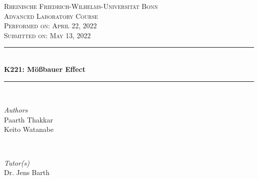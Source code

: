 \documentclass[a4paper]{report}
\numberwithin{equation}{section}
\begin{document}
\begin{titlepage} %
	\newcommand{\HRule}{\rule{\linewidth}{0.5mm}} %
	
	\center %
	
	\textsc{\LARGE Rheinische Friedrich-Wilhelms-Universit\"at Bonn }\\[4cm] %
	
	\textsc{\Large Advanced Laboratory Course}\\[0.5cm] %
	
	\textsc{\large Performed on: April 22, 2022}\\[0.5cm] %

	\textsc{\large Submitted on: May 13, 2022}\\[0.5cm] %
	
	
	\HRule\\[0.4cm]
	
	{\huge\bfseries K221: M{\"{o}}{\ss}bauer Effect}\\[0.4cm] %
	
	\HRule\\[1.5cm]
	
	
	\begin{minipage}{0.4\textwidth}
		\begin{flushleft}
			\large
			\textit{Authors}\\
			Paarth Thakkar \\
			Keito Watanabe
		\end{flushleft}
	\end{minipage}
	~
	\begin{minipage}{0.4\textwidth}
		\begin{flushright}
			\large
			\textit{Tutor(s)}\\
			Dr. Jens Barth
		\end{flushright}
	\end{minipage}


\end{titlepage}
\end{document}
